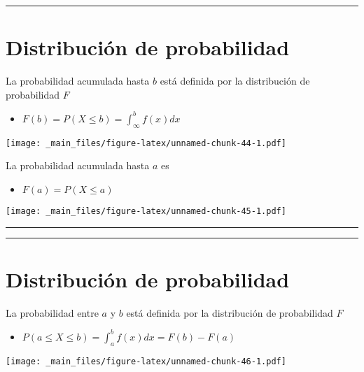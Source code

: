 \documentclass[
]{book}
\providecommand{\tightlist}{%
  \setlength{\itemsep}{0pt}\setlength{\parskip}{0pt}}
\begin{document}
\begin{center}\rule{0.5\linewidth}{0.5pt}\end{center}

\hypertarget{distribuciuxf3n-de-probabilidad-1}{%
\section{Distribución de probabilidad}\label{distribuciuxf3n-de-probabilidad-1}}

La probabilidad acumulada hasta \(b\) está definida por la distribución de probabilidad \(F\)

\begin{itemize}
\tightlist
\item
  \(F(b) = P(X \leq b)=\int_\infty^bf(x)dx\)
\end{itemize}

\texttt{[image: \_main\_files/figure-latex/unnamed-chunk-44-1.pdf]}

La probabilidad acumulada hasta \(a\) es

\begin{itemize}
\tightlist
\item
  \(F(a) = P(X \leq a)\)
\end{itemize}

\texttt{[image: \_main\_files/figure-latex/unnamed-chunk-45-1.pdf]}

\begin{center}\rule{0.5\linewidth}{0.5pt}\end{center}

\begin{center}\rule{0.5\linewidth}{0.5pt}\end{center}

\hypertarget{distribuciuxf3n-de-probabilidad-2}{%
\section{Distribución de probabilidad}\label{distribuciuxf3n-de-probabilidad-2}}

La probabilidad entre \(a\) y \(b\) está definida por la distribución de probabilidad \(F\)

\begin{itemize}
\tightlist
\item
  \(P(a\leq X \leq b) = \int_a^b f(x)dx=F(b)-F(a)\)
\end{itemize}

\texttt{[image: \_main\_files/figure-latex/unnamed-chunk-46-1.pdf]}
\end{document}
